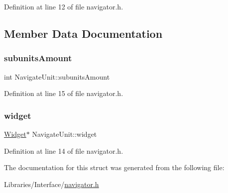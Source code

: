 Definition at line 12 of file navigator.\+h.



\subsection{Member Data Documentation}
\mbox{\label{struct_navigate_unit_a59e42d03540ccad6017bc708cab71893}} 
\subsubsection{\texorpdfstring{subunitsAmount}{subunitsAmount}}
{\footnotesize\ttfamily int Navigate\+Unit\+::subunits\+Amount}



Definition at line 15 of file navigator.\+h.

\mbox{\label{struct_navigate_unit_a04a97a78df45d0f2268b8352f64d43f5}} 
\subsubsection{\texorpdfstring{widget}{widget}}
{\footnotesize\ttfamily \mbox{\hyperlink{class_widget}{Widget}}$\ast$ Navigate\+Unit\+::widget}



Definition at line 14 of file navigator.\+h.



The documentation for this struct was generated from the following file\+:\begin{DoxyCompactItemize}
\item 
Libraries/\+Interface/\mbox{\hyperlink{navigator_8h}{navigator.\+h}}\end{DoxyCompactItemize}
